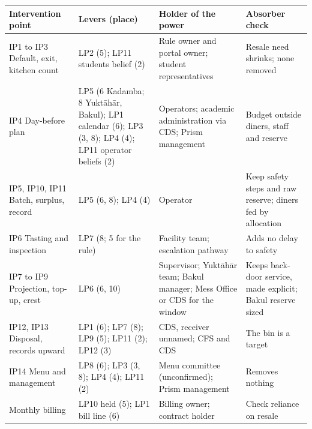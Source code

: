 \documentclass[
  10pt,
  table]{article}
\newcounter{none} %
\begin{document}
{\def\LTcaptype{none} %
\begin{longtable}[]{@{}
  >{\raggedright\arraybackslash}p{}
  >{\raggedright\arraybackslash}p{}
  >{\raggedright\arraybackslash}p{}
  >{\raggedright\arraybackslash}p{}@{}}
\toprule\noalign{}
\begin{minipage}[b]{\linewidth}\raggedright
\cellcolor{pblue}\color{white}\bfseries Intervention point
\end{minipage} & \begin{minipage}[b]{\linewidth}\raggedright
\cellcolor{pblue}\color{white}\bfseries Levers (place)
\end{minipage} & \begin{minipage}[b]{\linewidth}\raggedright
\cellcolor{pblue}\color{white}\bfseries Holder of the power
\end{minipage} & \begin{minipage}[b]{\linewidth}\raggedright
\cellcolor{pblue}\color{white}\bfseries Absorber check
\end{minipage} \\
\midrule\noalign{}
\endhead
\bottomrule\noalign{}
\endlastfoot
IP1 to IP3 Default, exit, kitchen count & LP2 (5); LP11 students\textquotesingle{} belief (2) & Rule owner and portal owner; student representatives & Resale need shrinks; none removed \\
IP4 Day-before plan & LP5 (6 Kadamba; 8 Yuktāhār, Bakul); LP1 calendar (6); LP3 (3, 8); LP4 (4); LP11 operator beliefs (2) & Operators; academic administration via CDS; Prism management & Budget outside diners, staff and reserve \\
IP5, IP10, IP11 Batch, surplus, record & LP5 (6, 8); LP4 (4) & Operator & Keep safety steps and raw reserve; diners fed by allocation \\
IP6 Tasting and inspection & LP7 (8; 5 for the rule) & Facility team; escalation pathway & Adds no delay to safety \\
IP7 to IP9 Projection, top-up, crest & LP6 (6, 10) & Supervisor; Yuktāhār team; Bakul manager; Mess Office or CDS for the window & Keeps back-door service, made explicit; Bakul reserve sized \\
IP12, IP13 Disposal, records upward & LP1 (6); LP7 (8); LP9 (5); LP11 (2); LP12 (3) & CDS, receiver unnamed; CFS and CDS & The bin is a target \\
IP14 Menu and management & LP8 (6); LP3 (3, 8); LP4 (4); LP11 (2) & Menu committee (unconfirmed); Prism management & Removes nothing \\
Monthly billing & LP10 held (5); LP1 bill line (6) & Billing owner; contract holder & Check reliance on resale \\
\end{longtable}
}
\end{document}

